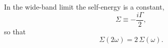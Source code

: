 \documentclass{article}
\begin{document}
In the wide-band limit the self-energy is a constant,
\begin{equation}
\Sigma \equiv -\frac{i\Gamma}{2} ,
\label{eq:wb}
\end{equation}
so that
\begin{equation}
\Sigma(2\omega) = 2\,\Sigma(\omega) .
\label{eq:hom}
\end{equation}
\end{document}
